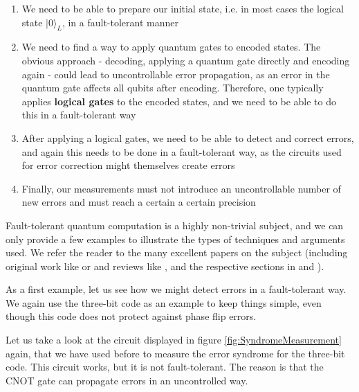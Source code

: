 \documentclass[a4paper, draft]{article}
\theoremstyle{own}
\theoremstyle{remark}
\begin{document}
\begin{enumerate}
	\item We need to be able to prepare our initial state, i.e. in most cases the logical state $|0 \rangle_L$, in a fault-tolerant manner
	\item We need to find a way to apply quantum gates to encoded states. The obvious approach - decoding, applying a quantum gate directly and encoding again - could lead to uncontrollable error propagation, as an error in the quantum gate affects all qubits after encoding. Therefore, one typically applies {\bf logical gates} to the encoded states, and we need to be able to do this in a fault-tolerant way
	\item After applying a logical gates, we need to be able to detect and correct errors, and again this needs to be done in a fault-tolerant way, as the circuits used for error correction might themselves create errors
	\item Finally, our measurements must not introduce an uncontrollable number of new errors and must reach a certain a certain precision
\end{enumerate}

Fault-tolerant quantum computation is a highly non-trivial subject, and we can only provide a few examples to illustrate the types of techniques and arguments used. We refer the reader to the many excellent papers on the subject (including original work like \cite{Shor96} or \cite{GThesis} and reviews like \cite{Kempe}, \cite{Beginners} and the respective sections in \cite{RieffelPolak} and \cite{NC}).

As a first example, let us see how we might detect errors in a fault-tolerant way. We again use the three-bit code as an example to keep things simple, even though this code does not protect against phase flip errors.

Let us take a look at the circuit displayed in figure \ref{fig:SyndromeMeasurement} again, that we have used before to measure the error syndrome for the three-bit code. This circuit works, but it is not fault-tolerant. The reason is that the CNOT gate can propagate errors in an uncontrolled way.
\end{document}
